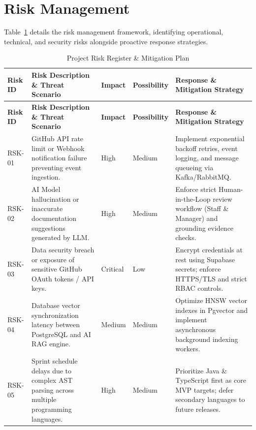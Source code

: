 \section{Risk Management}

Table~\ref{tab:risk} details the risk management framework, identifying operational,
technical, and security risks alongside proactive response strategies.

\begin{footnotesize}
\begin{longtable}{|p{1.4cm}|p{4cm}|p{1.3cm}|p{1.7cm}|p{4.4cm}|}
\caption{Project Risk Register \& Mitigation Plan}\label{tab:risk}\\
\hline
\hline
\textbf{Risk ID} & \textbf{Risk Description \& Threat Scenario} & \textbf{Impact} & \textbf{Possibility} & \textbf{Response \& Mitigation Strategy} \\
\hline
\hline
\endfirsthead
\hline
\textbf{Risk ID} & \textbf{Risk Description \& Threat Scenario} & \textbf{Impact} & \textbf{Possibility} & \textbf{Response \& Mitigation Strategy} \\
\hline
\hline
\endhead
RSK-01 & GitHub API rate limit or Webhook notification failure preventing event ingestion. & High & Medium & Implement exponential backoff retries, event logging, and message queueing via Kafka/RabbitMQ. \\
\hline
RSK-02 & AI Model hallucination or inaccurate documentation suggestions generated by LLM. & High & Medium & Enforce strict Human-in-the-Loop review workflow (Staff \& Manager) and grounding evidence checks. \\
\hline
RSK-03 & Data security breach or exposure of sensitive GitHub OAuth tokens / API keys. & Critical & Low & Encrypt credentials at rest using Supabase secrets; enforce HTTPS/TLS and strict RBAC controls. \\
\hline
RSK-04 & Database vector synchronization latency between PostgreSQL and AI RAG engine. & Medium & Medium & Optimize HNSW vector indexes in Pgvector and implement asynchronous background indexing workers. \\
\hline
RSK-05 & Sprint schedule delays due to complex AST parsing across multiple programming languages. & High & Medium & Prioritize Java \& TypeScript first as core MVP targets; defer secondary languages to future releases. \\
\hline
\hline
\end{longtable}
\end{footnotesize}

